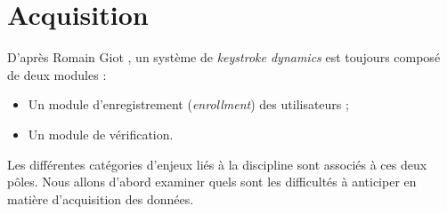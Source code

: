 \section{Acquisition}

D'après Romain Giot \cite{giotBenchmark}, un système de \textit{keystroke dynamics} est toujours composé de deux modules :

\begin{itemize}
	\item
	Un module d'enregistrement (\textit{enrollment}) des utilisateurs ;
	\item 
	Un module de vérification.
\end{itemize}

Les différentes catégories d'enjeux liés à la discipline sont associés à ces deux pôles. Nous allons d'abord examiner quels sont les difficultés à anticiper en matière d'acquisition des données.


